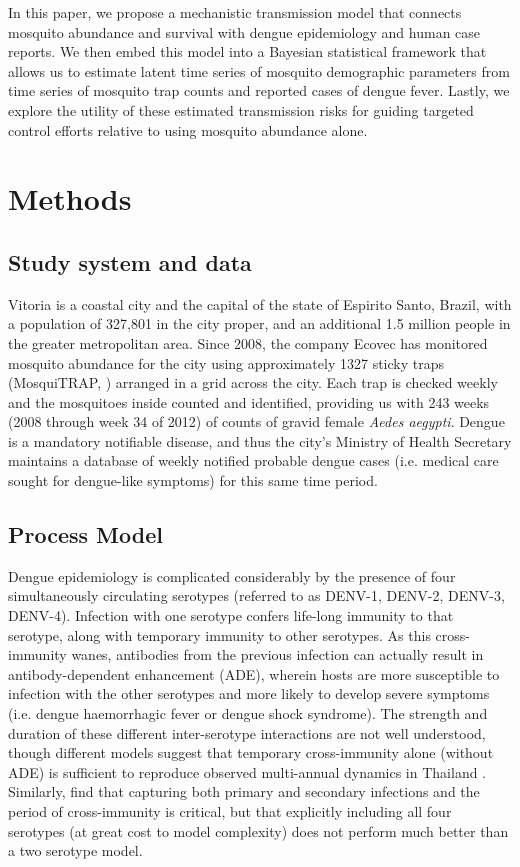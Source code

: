 \documentclass[10pt,letterpaper]{article}
\begin{document}
In this paper, we propose a mechanistic transmission model that connects mosquito abundance and survival with dengue epidemiology and human case reports.
We then embed this model into a Bayesian statistical framework that allows us to estimate latent time series of mosquito demographic parameters from time series of mosquito trap counts and reported cases of dengue fever.
Lastly, we explore the utility of these estimated transmission risks for guiding targeted control efforts relative to using mosquito abundance alone.

\section*{Methods}

\subsection*{Study system and data}

Vitoria is a coastal city and the capital of the state of Espirito Santo, Brazil, with a population of 327,801 in the city proper, and an additional 1.5 million people in the greater metropolitan area.  
Since 2008, the company Ecovec has monitored mosquito abundance for the city using approximately 1327 sticky traps (MosquiTRAP, \cite{Eiras2009}) arranged in a grid across the city.
Each trap is checked weekly and the mosquitoes inside counted and identified, providing us with 243 weeks (2008 through week 34 of 2012) of counts of gravid female \emph{Aedes aegypti}.
Dengue is a mandatory notifiable disease, and thus the city's Ministry of Health Secretary maintains a database of weekly notified probable dengue cases (i.e. medical care sought for dengue-like symptoms) for this same time period.

\subsection*{Process Model}

Dengue epidemiology is complicated considerably by the presence of four simultaneously circulating serotypes (referred to as DENV-1, DENV-2, DENV-3, DENV-4).
Infection with one serotype confers life-long immunity to that serotype, along with temporary immunity to other serotypes.  
As this cross-immunity wanes, antibodies from the previous infection can actually result in antibody-dependent enhancement (ADE), wherein hosts are more susceptible to infection with the other serotypes and more likely to develop severe symptoms (i.e. dengue haemorrhagic fever or dengue shock syndrome).
The strength and duration of these different inter-serotype interactions are not well understood, though different models suggest that temporary cross-immunity alone (without ADE) is sufficient to reproduce observed multi-annual dynamics in Thailand \cite{Wearing2006,Reich2013}.
Similarly, \cite{Aguiar2013} find that capturing both primary and secondary infections and the period of cross-immunity is critical, but that explicitly including all four serotypes (at great cost to model complexity) does not perform much better than a two serotype model.
\end{document}
